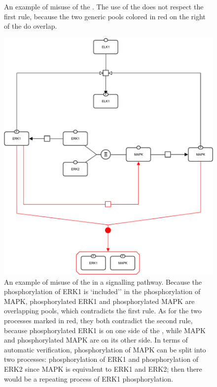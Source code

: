 \begin{figure}
\begin{center}
\end{center}
\caption{An example of misuse of the . The use of the  does not respect the first rule, because the two generic pools colored in red on the right of the  do overlap.}
\label{fig:D3_3}
\end{figure}

\begin{figure}
\begin{center}
\includegraphics[scale=0.35]{examples/D3_1}
\end{center}
\caption{An example of misuse of the  in a signalling pathway.
Because the phosphorylation of ERK1 is `included'' in the phosphorylation of MAPK, phosphorylated ERK1 and phosphorylated MAPK are overlapping pools, which contradicts the first rule.
As for the two processes marked in red, they both contradict the second rule, because phosphorylated ERK1 is on one side of the , while MAPK and phosphorylated MAPK are on its other side.
In terms of automatic verification, phosphorylation of MAPK can be split into two processes: phosphorylation of ERK1 and phosphorylation of ERK2 since MAPK is equivalent to ERK1 and ERK2; then there would be a repeating process of ERK1 phosphorylation.}
\label{fig:D3_1}
\end{figure}

